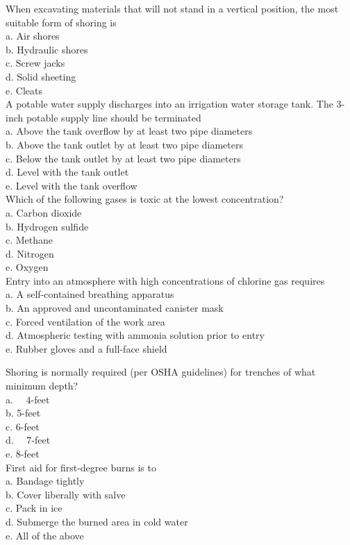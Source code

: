 When excavating materials that will not stand in a vertical position, the most suitable form of shoring is\\
a. Air shores\\
b. Hydraulic shores\\
c. Screw jacks\\
d. Solid sheeting\\
e. Cleats\\

A potable water supply discharges into an irrigation water storage tank. The 3-inch potable supply line should be terminated\\
a. Above the tank overflow by at least two pipe diameters\\
b. Above the tank outlet by at least two pipe diameters\\
c. Below the tank outlet by at least two pipe diameters\\
d. Level with the tank outlet\\
e. Level with the tank overflow\\

Which of the following gases is toxic at the lowest concentration?\\
a. Carbon dioxide\\
b. Hydrogen sulfide\\
c. Methane\\
d. Nitrogen\\
e. Oxygen\\

Entry into an atmosphere with high concentrations of chlorine gas requires\\
a. A self-contained breathing apparatus\\
b. An approved and uncontaminated canister mask\\
c. Forced ventilation of the work area\\
d. Atmospheric testing with ammonia solution prior to entry\\
e. Rubber gloves and a full-face shield 

Shoring is normally required (per OSHA guidelines) for trenches of what minimum depth?\\
a. $\quad 4$-feet\\
b. 5-feet\\
c. 6-feet\\
d. $\quad 7$-feet\\
e. 8-feet\\

First aid for first-degree burns is to\\
a. Bandage tightly\\
b. Cover liberally with salve\\
c. Pack in ice\\
d. Submerge the burned area in cold water\\
e. All of the above\\

